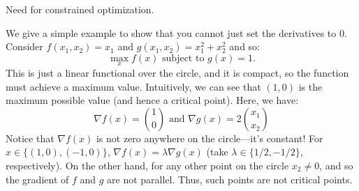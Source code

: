 \begin{example}
    \caption{Need for constrained optimization.}
    We give a simple example to show that you cannot just set the derivatives to $0$.
    Consider $f(x_1 ,x_2 ) = x_1$ and $g(x_1 ,x_2 ) = x^2_1 + x^2_2$ and so:
    \[
        \max_x f(x) \text{ subject to } g(x) = 1.
    \]
    This is just a linear functional over the circle, and it is compact, so the
    function must achieve a maximum value. Intuitively, we can see that $(1,0)$ is the
    maximum possible value (and hence a critical point). Here, we have:
    \[
        \nabla f(x) = \binom{1}{0} \text{ and } \nabla g(x) = 2 \binom{x_1}{x_2}
    \]
    Notice that $\nabla f(x)$ is not zero anywhere on the circle---it's constant!
    For $x \in \{(1,0),(-1,0)\}$, $\nabla f(x) = \lambda\nabla g(x)$ (take $\lambda \in \{1/2,-1/2\}$, respectively).
    On the other hand, for any other point on the circle $x_2 \ne 0$, and so the gradient of $f$
    and $g$ are not parallel. Thus, such points are not critical points.
\end{example}
